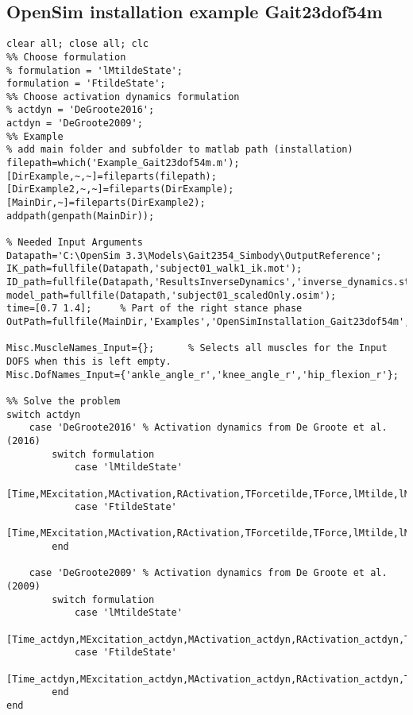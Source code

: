 \documentclass[a4paper,oneside,11pt]{article}
\begin{document}
\subsection{OpenSim installation example Gait23dof54m}

\begin{lstlisting}[frame=none,basicstyle=\tiny]
clear all; close all; clc
%% Choose formulation
% formulation = 'lMtildeState';
formulation = 'FtildeState';
%% Choose activation dynamics formulation
% actdyn = 'DeGroote2016';
actdyn = 'DeGroote2009';
%% Example
% add main folder and subfolder to matlab path (installation)
filepath=which('Example_Gait23dof54m.m'); [DirExample,~,~]=fileparts(filepath); [DirExample2,~,~]=fileparts(DirExample); [MainDir,~]=fileparts(DirExample2);
addpath(genpath(MainDir));

% Needed Input Arguments
Datapath='C:\OpenSim 3.3\Models\Gait2354_Simbody\OutputReference';
IK_path=fullfile(Datapath,'subject01_walk1_ik.mot');
ID_path=fullfile(Datapath,'ResultsInverseDynamics','inverse_dynamics.sto');
model_path=fullfile(Datapath,'subject01_scaledOnly.osim');
time=[0.7 1.4];     % Part of the right stance phase
OutPath=fullfile(MainDir,'Examples','OpenSimInstallation_Gait23dof54m','Results');

Misc.MuscleNames_Input={};      % Selects all muscles for the Input DOFS when this is left empty.
Misc.DofNames_Input={'ankle_angle_r','knee_angle_r','hip_flexion_r'};

%% Solve the problem
switch actdyn
    case 'DeGroote2016' % Activation dynamics from De Groote et al. (2016)            
        switch formulation
            case 'lMtildeState'
                [Time,MExcitation,MActivation,RActivation,TForcetilde,TForce,lMtilde,lM,MuscleNames,OptInfo,DatStore]=SolveMuscleRedundancy_lMtildeState(model_path,IK_path,ID_path,time,OutPath,Misc);
            case 'FtildeState'   
                [Time,MExcitation,MActivation,RActivation,TForcetilde,TForce,lMtilde,lM,MuscleNames,OptInfo,DatStore]=SolveMuscleRedundancy_FtildeState(model_path,IK_path,ID_path,time,OutPath,Misc);
        end
        
    case 'DeGroote2009' % Activation dynamics from De Groote et al. (2009)   
        switch formulation
            case 'lMtildeState'
                [Time_actdyn,MExcitation_actdyn,MActivation_actdyn,RActivation_actdyn,TForcetilde_actdyn,TForce_actdyn,lMtilde_actdyn,lM_actdyn,MuscleNames_actdyn,OptInfo_actdyn,DatStore_actdyn]=SolveMuscleRedundancy_lMtildeState_actdyn(model_path,IK_path,ID_path,time,OutPath,Misc);
            case 'FtildeState'   
                [Time_actdyn,MExcitation_actdyn,MActivation_actdyn,RActivation_actdyn,TForcetilde_actdyn,TForce_actdyn,lMtilde_actdyn,lM_actdyn,MuscleNames_actdyn,OptInfo_actdyn,DatStore_actdyn]=SolveMuscleRedundancy_FtildeState_actdyn(model_path,IK_path,ID_path,time,OutPath,Misc);
        end
end
\end{lstlisting}
\end{document}
